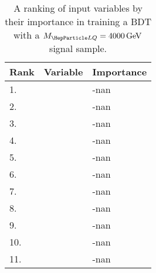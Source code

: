 \begin{table}[H]
	\caption{A ranking of input variables by their importance in training a BDT with a $\MLQ = \SI{4000}{GeV}$ signal sample.}
	\begin{center}
		\begin{tabular}{lll} \hline \hline
			Rank & Variable & Importance  \\ \hline
			1. & \Muu & -nan \\
			2. & \Muujj & -nan \\
			3. & \MujOne & -nan \\
			4. & \MujTwo & -nan \\
			5. & \ST & -nan \\
			6. & \MET & -nan \\
			7. & \ptof{\PmuOne} & -nan \\
			8. & \ptof{\PmuTwo} & -nan \\
			9. & \ptof{\PjOne} & -nan \\
			10. & \ptof{\PjTwo} & -nan \\
			11. & \DRof{\PmuOne+\PmuTwo}{\PjOne} & -nan \\ \hline \hline
		\end{tabular}
		\label{tab:bdtRank4000}
	\end{center}
\end{table}
